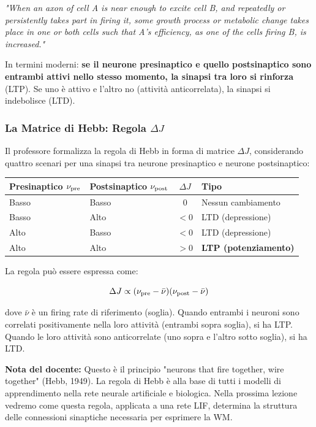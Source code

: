 \begin{tcolorbox}[colback=white, colframe=gray!40, arc=2mm, boxrule=0.5pt]
\textit{"When an axon of cell A is near enough to excite cell B, and repeatedly or persistently takes part in firing it, some growth process or metabolic change takes place in one or both cells such that A's efficiency, as one of the cells firing B, is increased."}
\end{tcolorbox}

In termini moderni: \textbf{se il neurone presinaptico e quello postsinaptico sono entrambi attivi nello stesso momento, la sinapsi tra loro si rinforza} (LTP). Se uno è attivo e l'altro no (attività anticorrelata), la sinapsi si indebolisce (LTD).

\subsubsection{La Matrice di Hebb: Regola $\Delta J$}

Il professore formalizza la regola di Hebb in forma di matrice $\Delta J$, considerando quattro scenari per una sinapsi tra neurone presinaptico e neurone postsinaptico:

\begin{table}[htbp]
    \centering
    \renewcommand{\arraystretch}{1.3}
    \begin{tabularx}{\textwidth}{|X|X|c|X|}
    \hline
    \textbf{Presinaptico $\nu_{\rm pre}$} & \textbf{Postsinaptico $\nu_{\rm post}$} & \textbf{$\Delta J$} & \textbf{Tipo} \\
    \hline
    Basso & Basso & $0$ & Nessun cambiamento \\
    \hline
    Basso & Alto & $< 0$ & LTD (depressione) \\
    \hline
    Alto & Basso & $< 0$ & LTD (depressione) \\
    \hline
    Alto & Alto & $> 0$ & \textbf{LTP (potenziamento)} \\
    \hline
    \end{tabularx}
\end{table}

La regola può essere espressa come:

\begin{equation}
\Delta J \propto (\nu_{\rm pre} - \bar{\nu})(\nu_{\rm post} - \bar{\nu})
\end{equation}

dove $\bar{\nu}$ è un firing rate di riferimento (soglia). Quando entrambi i neuroni sono correlati positivamente nella loro attività (entrambi sopra soglia), si ha LTP. Quando le loro attività sono anticorrelate (uno sopra e l'altro sotto soglia), si ha LTD.

\begin{tcolorbox}[colback=gray!5, colframe=gray!40, arc=2mm, boxrule=0.5pt]
\textbf{Nota del docente:} Questo è il principio "neurons that fire together, wire together" (Hebb, 1949). La regola di Hebb è alla base di tutti i modelli di apprendimento nella rete neurale artificiale e biologica. Nella prossima lezione vedremo come questa regola, applicata a una rete LIF, determina la struttura delle connessioni sinaptiche necessaria per esprimere la WM.
\end{tcolorbox}


